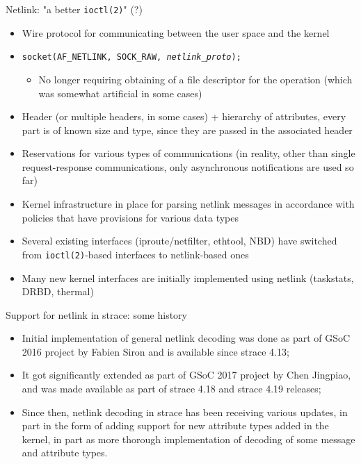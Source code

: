 \documentclass[unicode,aspectratio=169]{beamer}
\begin{document}
\begin{frame}{Netlink: "a better \texttt{ioctl(2)}" (?)}
\begin{itemize}
  \item Wire protocol for communicating between the user space and the kernel
  \item \texttt{socket(AF\_NETLINK, SOCK\_RAW, \textit{netlink\_proto});}
  \begin{itemize}
    \item No longer requiring obtaining of a file descriptor for the operation
          (which was somewhat artificial in some cases)
  \end{itemize}
  \item Header (or multiple headers, in some cases) + hierarchy of attributes,
        every part is of known size and type, since they are passed
	in the associated header
  \item Reservations for various types of communications (in reality, other
        than single request-response communications, only asynchronous
	notifications are used so far)
  \item Kernel infrastructure in place for parsing netlink messages
        in accordance with policies that have provisions for various data types
  \item Several existing interfaces (iproute/netfilter, ethtool, NBD) have
        switched from \texttt{ioctl(2)}-based interfaces to netlink-based ones
  \item Many new kernel interfaces are initially implemented using netlink
        (taskstats, DRBD, thermal)
\end{itemize}
\end{frame}

\begin{frame}{Support for netlink in strace: some history}
\begin{itemize}
  \item Initial implementation of general netlink decoding was done as part
        of GSoC 2016 project by Fabien Siron and is available since strace 4.13;
  \item It got significantly extended as part of GSoC 2017 project
        by Chen Jingpiao, and was made available as part of strace 4.18
	and strace 4.19 releases;
  \item Since then, netlink decoding in strace has been receiving various
        updates, in part in the form of adding support for new attribute types
	added in the kernel, in part as more thorough implementation
	of decoding of some message and attribute types.
\end{itemize}
\end{frame}
\end{document}
